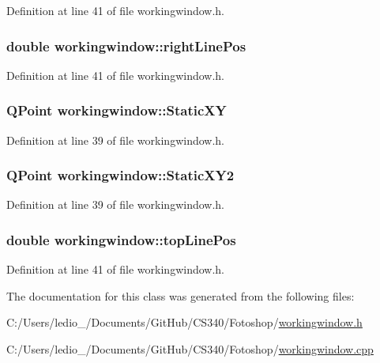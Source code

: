 Definition at line 41 of file workingwindow.\-h.

\hypertarget{classworkingwindow_ad140ff2651f5e7993503d5d862e4d385}{
\subsubsection[{right\-Line\-Pos}]{\setlength{\rightskip}{0pt plus 5cm}double workingwindow\-::right\-Line\-Pos}}\label{classworkingwindow_ad140ff2651f5e7993503d5d862e4d385}


Definition at line 41 of file workingwindow.\-h.

\hypertarget{classworkingwindow_aa0c6e8030d9bb3b26324aaf737f2be62}{
\subsubsection[{Static\-X\-Y}]{\setlength{\rightskip}{0pt plus 5cm}Q\-Point workingwindow\-::\-Static\-X\-Y}}\label{classworkingwindow_aa0c6e8030d9bb3b26324aaf737f2be62}


Definition at line 39 of file workingwindow.\-h.

\hypertarget{classworkingwindow_a0574618dfbe458eee7fac25620c2cf89}{
\subsubsection[{Static\-X\-Y2}]{\setlength{\rightskip}{0pt plus 5cm}Q\-Point workingwindow\-::\-Static\-X\-Y2}}\label{classworkingwindow_a0574618dfbe458eee7fac25620c2cf89}


Definition at line 39 of file workingwindow.\-h.

\hypertarget{classworkingwindow_a1d4abbc294787013faaa0b6f2ee25a2d}{
\subsubsection[{top\-Line\-Pos}]{\setlength{\rightskip}{0pt plus 5cm}double workingwindow\-::top\-Line\-Pos}}\label{classworkingwindow_a1d4abbc294787013faaa0b6f2ee25a2d}


Definition at line 41 of file workingwindow.\-h.



The documentation for this class was generated from the following files\-:\begin{DoxyCompactItemize}
\item 
C\-:/\-Users/ledio\-\_/\-Documents/\-Git\-Hub/\-C\-S340/\-Fotoshop/\hyperlink{workingwindow_8h}{workingwindow.\-h}\item 
C\-:/\-Users/ledio\-\_/\-Documents/\-Git\-Hub/\-C\-S340/\-Fotoshop/\hyperlink{workingwindow_8cpp}{workingwindow.\-cpp}\end{DoxyCompactItemize}
